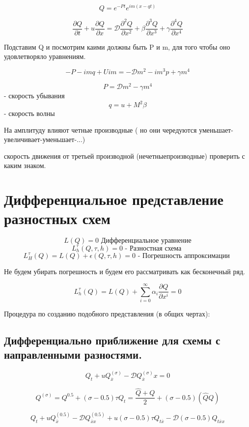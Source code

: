 \documentclass[14pt]{extarticle}
\begin{document}
\[ Q = e^{-P t } e^{im(x-qt)} \]

\[ \frac{\partial Q }{\partial t} + u \frac{\partial Q }{\partial x } = \mathcal{D } \frac{\partial^2 Q }{\partial x^2 } + \beta \frac{\partial^3 Q }{\partial x^3 } + \gamma \frac{\partial^4 Q }{\partial x^4} \]

Подставим Q и посмотрим каими должны быть P и m, для того чтобы оно удовлетворяло уравнениям.

\[ -P - i m q + U i m = - \mathcal{D} m^2 - i m^3 p + \gamma m^4 \]

\[ P = \mathcal{D }m^2 - \gamma m^4 \] - скорость убывания
\[ q = u + M^2 \beta \] - скорость волны

На амплитуду влияют четные производные ( но они чередуются уменьшает-увеличивает-уменьшает-...)

скорость движения от третьей производной (нечетныепроизводные) проверить с каким знаком.

\section{Дифференциальное представление разностных схем}

\[ L(Q) = 0 \textrm{ Дифференциальное уравнение} \]
\[ L^{\tau}_h (Q, \tau, h) = 0 \textrm{ - Разностная схема } \]
\[ L_H^{\tau} (Q) = L(Q) + \epsilon(Q, \tau, h) = 0 \textrm{ - Погрешность аппроксимации } \]

Не будем убирать погрешность и будем его рассматривать как бесконечный ряд.

\[ L_h^{\tau} (Q) = L(Q) + \sum_{i=0}^{\infty} \alpha_i \frac{\partial Q }{\partial x^i } = 0 \]

Процедура по созданию подобного представления (в общих чертах):

\subsection{Дифференциально приближение для схемы с направленными разностями.}

\[ Q_t + u Q^{(\sigma)}_{\overline{x}} - \mathcal{D} Q^{(\sigma)}_{\overline{x}} x = 0 \]

\[ Q^{(\sigma)} = Q^{0.5} + (\sigma - 0.5) \tau Q_t = \frac{\hat{Q} + Q}{2} + (\sigma - 0.5) (\hat{Q} Q)\]

\[ Q_t + u Q^{(0.5)}_{\overline{x}} - \mathcal{D} Q^{(0.5)}_{\overline{x} x} + u(\sigma - 0.5) \tau Q_{t \overline{x }} - \mathcal{D }(\sigma-0.5) Q_{t \overline{x} x} \]
\end{document}
